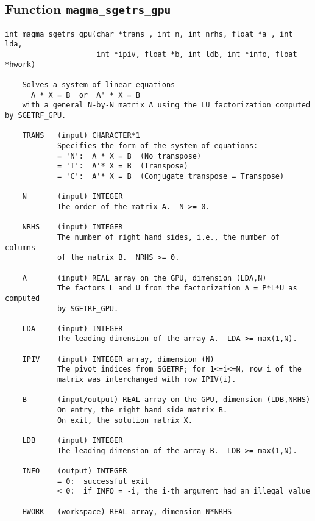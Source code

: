 \documentclass[10pt]{book}
\begin{document}
\subsection{Function {\tt {\bf magma\_sgetrs\_gpu}}}
\begin{verbatim}
int magma_sgetrs_gpu(char *trans , int n, int nrhs, float *a , int lda,
                     int *ipiv, float *b, int ldb, int *info, float *hwork)

    Solves a system of linear equations
      A * X = B  or  A' * X = B
    with a general N-by-N matrix A using the LU factorization computed by SGETRF_GPU.

    TRANS   (input) CHARACTER*1
            Specifies the form of the system of equations:
            = 'N':  A * X = B  (No transpose)
            = 'T':  A'* X = B  (Transpose)
            = 'C':  A'* X = B  (Conjugate transpose = Transpose)

    N       (input) INTEGER
            The order of the matrix A.  N >= 0.

    NRHS    (input) INTEGER
            The number of right hand sides, i.e., the number of columns
            of the matrix B.  NRHS >= 0.

    A       (input) REAL array on the GPU, dimension (LDA,N)
            The factors L and U from the factorization A = P*L*U as computed
            by SGETRF_GPU.

    LDA     (input) INTEGER
            The leading dimension of the array A.  LDA >= max(1,N).

    IPIV    (input) INTEGER array, dimension (N)
            The pivot indices from SGETRF; for 1<=i<=N, row i of the
            matrix was interchanged with row IPIV(i).

    B       (input/output) REAL array on the GPU, dimension (LDB,NRHS)
            On entry, the right hand side matrix B.
            On exit, the solution matrix X.

    LDB     (input) INTEGER
            The leading dimension of the array B.  LDB >= max(1,N).

    INFO    (output) INTEGER
            = 0:  successful exit
            < 0:  if INFO = -i, the i-th argument had an illegal value

    HWORK   (workspace) REAL array, dimension N*NRHS
\end{verbatim}

\newpage
\end{document}
